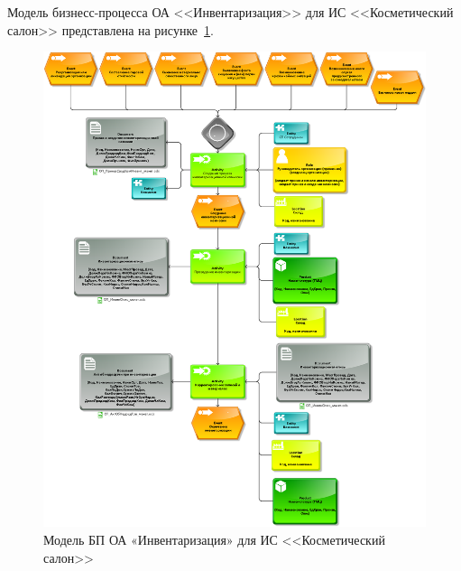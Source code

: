 \newpage

Модель бизнесс-процесса ОА <<Инвентаризация>> для ИС <<Косметический салон>> представлена на
рисунке~\ref{fig:MBP}.

\begin{figure}[!h]
    \centering
    \includegraphics[width=18cm]
        {_docs/МБП.png}
    \caption{Модель БП ОА «Инвентаризация» для ИС <<Косметический салон>>}
    \label{fig:MBP}
\end{figure}

\newpage
